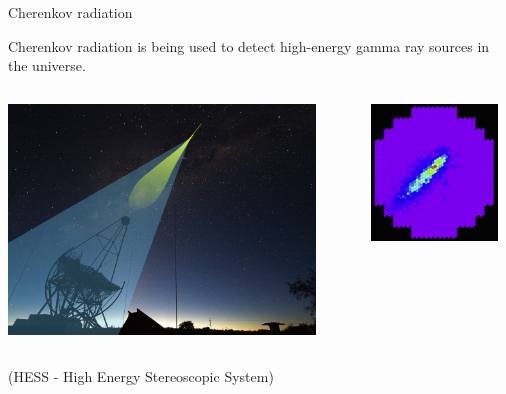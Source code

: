 \begin{frame}{Cherenkov radiation}

Cherenkov radiation is being used to detect high-energy gamma ray sources in the universe.

\begin{columns}
  \begin{column}{0.60\textwidth}
    \begin{center}
      \includegraphics[width=0.90\textwidth]{./images/photos/hess.jpg}\\
    \end{center}
  \end{column}
  \begin{column}{0.40\textwidth}
    \begin{center}
      \includegraphics[width=0.90\textwidth]{./images/photos/hess_event_display.png}\\
    \end{center}
  \end{column}
\end{columns}

(HESS - High Energy Stereoscopic System)

\end{frame}

